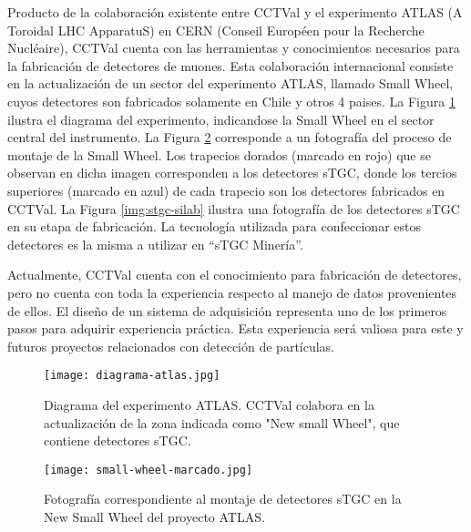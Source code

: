 	
	Producto de la colaboración existente entre CCTVal y el experimento ATLAS (A Toroidal LHC ApparatuS) en CERN (Conseil Européen pour la Recherche Nucléaire), CCTVal  cuenta con las herramientas y conocimientos necesarios para la fabricación de detectores de muones. Esta colaboración internacional consiste en la actualización de un sector del experimento ATLAS, llamado Small Wheel, cuyos detectores son fabricados solamente en Chile y otros 4 paises. La Figura  \ref{img:diagrama-atlas} ilustra el diagrama del experimento, indicandose la Small Wheel en el sector central del instrumento. La Figura \ref{img:small-wheel} corresponde a un fotografía  del proceso de montaje de la Small Wheel. Los trapecios dorados (marcado en rojo)  que se observan en dicha imagen corresponden a los detectores sTGC, donde los tercios superiores (marcado en azul) de cada trapecio son los detectores fabricados en CCTVal. La Figura \ref{img:stgc-silab} ilustra una fotografía de los detectores sTGC en su etapa de fabricación. La tecnología utilizada para confeccionar estos detectores es la misma a utilizar en ``sTGC Minería''.
	
	Actualmente, CCTVal  cuenta con el conocimiento para fabricación de detectores, pero no cuenta con toda la experiencia respecto al manejo de datos provenientes de ellos. El diseño de un sistema de adquisición representa uno de los primeros pasos para adquirir experiencia práctica. Esta experiencia será  valiosa para este y futuros proyectos relacionados con detección de partículas.
	
	
	\begin{figure}[h]
		\centering
		\texttt{[image: diagrama-atlas.jpg]}
		\caption{Diagrama del experimento ATLAS. CCTVal colabora en la actualización de la zona indicada como "New small Wheel", que contiene detectores sTGC.}
		\label{img:diagrama-atlas}
	\end{figure}

	\begin{figure}[h]
		\centering
		\texttt{[image: small-wheel-marcado.jpg]}
		\caption{Fotografía correspondiente al montaje de detectores sTGC en la New Small Wheel del proyecto ATLAS.}
		\label{img:small-wheel}
	\end{figure}
	
